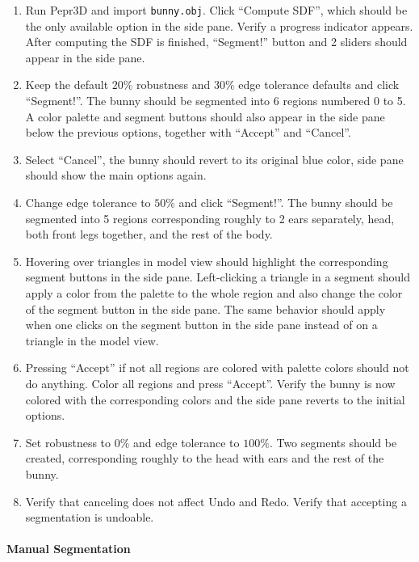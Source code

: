 \begin{enumerate}
\item Run Pepr3D and import \texttt{bunny.obj}. Click ``Compute SDF'', which should be the only available option in the side pane. Verify a progress indicator appears. After computing the SDF is finished, ``Segment!'' button and 2 sliders should appear in the side pane.
\item Keep the default $20\%$ robustness and $30\%$ edge tolerance defaults and click ``Segment!''. The bunny should be segmented into 6 regions numbered 0 to 5. A color palette and segment buttons should also appear in the side pane below the previous options, together with ``Accept'' and ``Cancel''.
\item Select ``Cancel'', the bunny should revert to its original blue color, side pane should show the main options again.
\item Change edge tolerance to $50\%$ and click ``Segment!''. The bunny should be segmented into 5 regions corresponding roughly to 2 ears separately, head, both front legs together, and the rest of the body.
\item Hovering over triangles in model view should highlight the corresponding segment buttons in the side pane. Left-clicking a triangle in a segment should apply a color from the palette to the whole region and also change the color of the segment button in the side pane. The same behavior should apply when one clicks on the segment button in the side pane instead of on a triangle in the model view.
\item Pressing ``Accept'' if not all regions are colored with palette colors should not do anything. Color all regions and press ``Accept''. Verify the bunny is now colored with the corresponding colors and the side pane reverts to the initial options.
\item Set robustness to $0\%$ and edge tolerance to $100\%$. Two segments should be created, corresponding roughly to the head with ears and the rest of the bunny.
\item Verify that canceling does not affect Undo and Redo. Verify that accepting a segmentation is undoable.
\end{enumerate}

\paragraph{Manual Segmentation}

